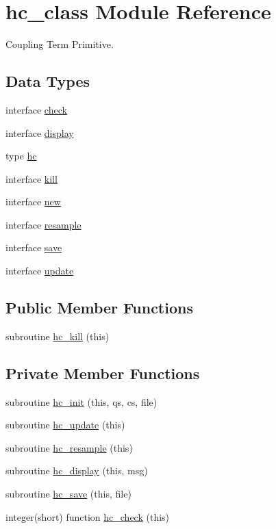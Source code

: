 \hypertarget{classhc__class}{\section{hc\-\_\-class Module Reference}
\label{classhc__class}
}


Coupling Term Primitive.  


\subsection*{Data Types}
\begin{DoxyCompactItemize}
\item 
interface \hyperlink{interfacehc__class_1_1check}{check}
\item 
interface \hyperlink{interfacehc__class_1_1display}{display}
\item 
type \hyperlink{structhc__class_1_1hc}{hc}
\item 
interface \hyperlink{interfacehc__class_1_1kill}{kill}
\item 
interface \hyperlink{interfacehc__class_1_1new}{new}
\item 
interface \hyperlink{interfacehc__class_1_1resample}{resample}
\item 
interface \hyperlink{interfacehc__class_1_1save}{save}
\item 
interface \hyperlink{interfacehc__class_1_1update}{update}
\end{DoxyCompactItemize}
\subsection*{Public Member Functions}
\begin{DoxyCompactItemize}
\item 
subroutine \hyperlink{classhc__class_a72759d56fe1bbe360bfe0efaae62b6a6}{hc\-\_\-kill} (this)
\end{DoxyCompactItemize}
\subsection*{Private Member Functions}
\begin{DoxyCompactItemize}
\item 
subroutine \hyperlink{classhc__class_a6a95655090afaac2c5f7b049c3919597}{hc\-\_\-init} (this, qs, cs, file)
\item 
subroutine \hyperlink{classhc__class_a5b4008b35ac8a501909a4b9aed8fcd71}{hc\-\_\-update} (this)
\item 
subroutine \hyperlink{classhc__class_a1b4a0d9a46c63f538c74670dca5fdc82}{hc\-\_\-resample} (this)
\item 
subroutine \hyperlink{classhc__class_a484af233bb8b65db73534ae297fa7346}{hc\-\_\-display} (this, msg)
\item 
subroutine \hyperlink{classhc__class_ac1fbe6abcc3415c55bd2b920cbb47234}{hc\-\_\-save} (this, file)
\item 
integer(short) function \hyperlink{classhc__class_ad0b55c92720ef59cfd8b4cecd194afe1}{hc\-\_\-check} (this)
\end{DoxyCompactItemize}


